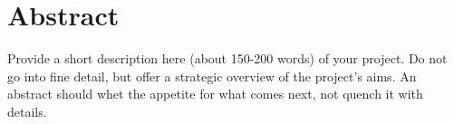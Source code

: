 \chapter*{Abstract}

Provide a short description here (about 150-200 words) of your project. Do not go into fine detail, but offer a strategic overview of the project’s aims. An abstract should whet the appetite for what comes next, not quench it with details.
